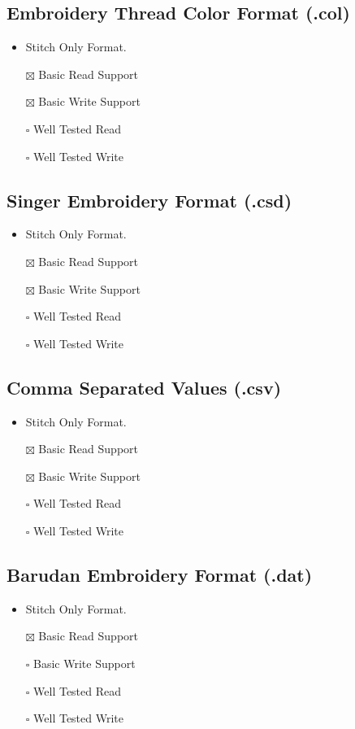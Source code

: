 \documentclass[onesize, a4paper]{refart}
\providecommand{\tightlist}{\setlength{\itemsep}{0pt}\setlength{\parskip}{0pt}}
\begin{document}
\subsection{Embroidery Thread Color Format (.col)}

\begin{itemize}
\tightlist
\item Stitch Only Format.
\item[$\boxtimes$] Basic Read Support
\item[$\boxtimes$] Basic Write Support
\item[$\square$] Well Tested Read
\item[$\square$] Well Tested Write
\end{itemize}

\subsection{Singer Embroidery Format (.csd)}

\begin{itemize}
\tightlist
\item Stitch Only Format.
\item[$\boxtimes$] Basic Read Support
\item[$\boxtimes$] Basic Write Support
\item[$\square$] Well Tested Read
\item[$\square$] Well Tested Write
\end{itemize}

\subsection{Comma Separated Values (.csv)}

\begin{itemize}
\tightlist
\item Stitch Only Format.
\item[$\boxtimes$] Basic Read Support
\item[$\boxtimes$] Basic Write Support
\item[$\square$] Well Tested Read
\item[$\square$] Well Tested Write
\end{itemize}

\subsection{Barudan Embroidery Format (.dat)}

\begin{itemize}
\tightlist
\item Stitch Only Format.
\item[$\boxtimes$] Basic Read Support
\item[$\square$] Basic Write Support
\item[$\square$] Well Tested Read
\item[$\square$] Well Tested Write
\end{itemize}
\end{document}
